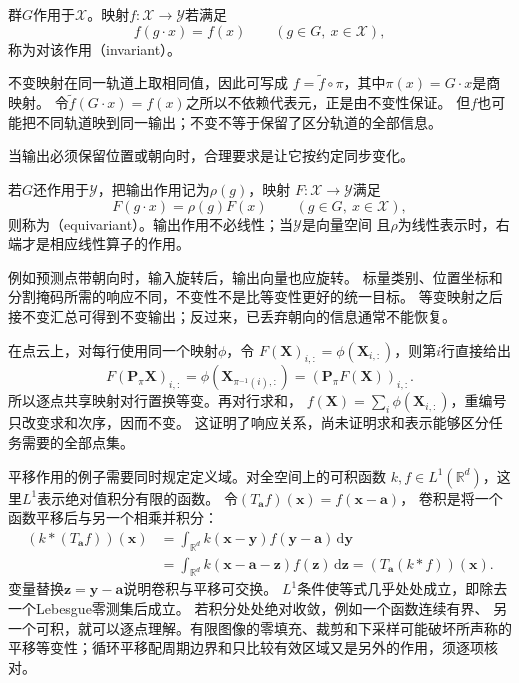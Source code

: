 \begin{definition}[不变映射]
\label{def:geometry-invariant-map}
群$G$作用于$\mathcal X$。映射$f:\mathcal X\to\mathcal Y$若满足
\begin{equation}
 f(g\cdot x)=f(x)\qquad(g\in G,\ x\in\mathcal X),
 \label{eq:geometry-invariant-map}
\end{equation}
称为对该作用（invariant）。
\end{definition}
不变映射在同一轨道上取相同值，因此可写成
$f=\widetilde f\circ\pi$，其中$\pi(x)=G\cdot x$是商映射。
令$\widetilde f(G\cdot x)=f(x)$之所以不依赖代表元，正是由不变性保证。
但$f$也可能把不同轨道映到同一输出；不变不等于保留了区分轨道的全部信息。


当输出必须保留位置或朝向时，合理要求是让它按约定同步变化。
\begin{definition}[等变映射]
\label{def:geometry-equivariant-map}
若$G$还作用于$\mathcal Y$，把输出作用记为$\rho(g)$，映射
$F:\mathcal X\to\mathcal Y$满足
\begin{equation}
 F(g\cdot x)=\rho(g)F(x)\qquad(g\in G,\ x\in\mathcal X),
 \label{eq:geometry-equivariant-map}
\end{equation}
则称为（equivariant）。输出作用不必线性；当$\mathcal Y$是向量空间
且$\rho$为线性表示时，右端才是相应线性算子的作用。
\end{definition}
例如预测点带朝向时，输入旋转后，输出向量也应旋转。
标量类别、位置坐标和分割掩码所需的响应不同，不变性不是比等变性更好的统一目标。
等变映射之后接不变汇总可得到不变输出；反过来，已丢弃朝向的信息通常不能恢复。

在点云上，对每行使用同一个映射$\phi$，令
$F(\bm X)_{i,:}=\phi(\bm X_{i,:})$，则第$i$行直接给出
\[
 F(\bm P_\pi\bm X)_{i,:}
 =\phi(\bm X_{\pi^{-1}(i),:})
 =(\bm P_\pi F(\bm X))_{i,:}.
\]
所以逐点共享映射对行置换等变。再对行求和，
$f(\bm X)=\sum_i\phi(\bm X_{i,:})$，重编号只改变求和次序，因而不变。
这证明了响应关系，尚未证明求和表示能够区分任务需要的全部点集。

平移作用的例子需要同时规定定义域。对全空间上的可积函数
$k,f\in L^1(\mathbb R^d)$，这里$L^1$表示绝对值积分有限的函数。
令$(T_{\bm a}f)(\bm x)=f(\bm x-\bm a)$，
卷积是将一个函数平移后与另一个相乘并积分：
\begin{align}
 (k*(T_{\bm a}f))(\bm x)
 &=\int_{\mathbb R^d}k(\bm x-\bm y)f(\bm y-\bm a)\,\mathrm d\bm y\\
 &=\int_{\mathbb R^d}k(\bm x-\bm a-\bm z)f(\bm z)\,\mathrm d\bm z
   =(T_{\bm a}(k*f))(\bm x).
 \label{eq:geometry-translation-convolution-equivariance}
\end{align}
变量替换$\bm z=\bm y-\bm a$说明卷积与平移可交换。
$L^1$条件使等式几乎处处成立，即除去一个Lebesgue零测集后成立。
若积分处处绝对收敛，例如一个函数连续有界、
另一个可积，就可以逐点理解。有限图像的零填充、裁剪和下采样可能破坏所声称的
平移等变性；循环平移配周期边界和只比较有效区域又是另外的作用，须逐项核对。


